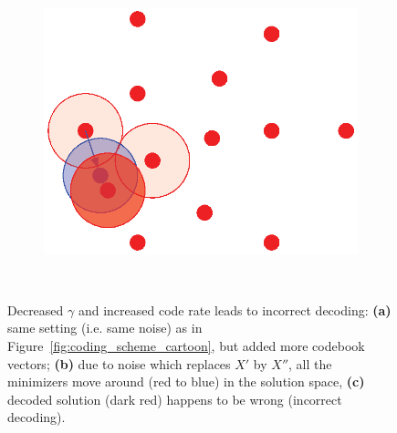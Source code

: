 \begin{figure}[th!]
\begin{subfigure}[b]{.48\textwidth}
      \caption{}
      \label{fig:coding_scheme_cartoon_6}
  \end{subfigure}
  \hfill
  \begin{subfigure}[b]{.48\textwidth}
      \includegraphics[width=\linewidth]{figures/ch_generic_approach/coding_scheme_7}
      \caption{}
      \label{fig:coding_scheme_cartoon_7}
  \end{subfigure}
  \\[.5cm]
  \caption{Decreased $\gamma$ and increased code rate leads to incorrect
    decoding: \textbf{(a)} same setting (i.e. same noise) as in
    Figure~\ref{fig:coding_scheme_cartoon}, but added more codebook
    vectors; \textbf{(b)} due to noise which replaces $X'$ by $X''$, all the
    minimizers move around (red to blue) in the solution space, \textbf{(c)}
    decoded solution (dark red) happens to be wrong (incorrect decoding).}
  \label{fig:coding_scheme_cartoon_incorrect}
\end{figure}

